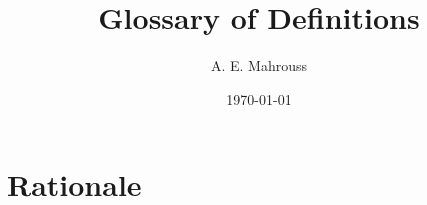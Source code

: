 \documentclass[10pt]{article}
\title{Glossary of Definitions}
\author{A. E. Mahrouss}
\date{\today}
\theoremstyle{plain}
\theoremstyle{definition}
\theoremstyle{remark}
\begin{document}
\maketitle

\section{Rationale}
\end{document}
